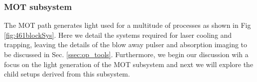 %	
%		
		
\subsubsection{MOT subsystem} \label{sec:motsubsystem}
The MOT path generates light used for a multitude of processes as shown in Fig \ref{fig:461blockSys}.
Here we detail the systems required for laser cooling and trapping, leaving the details of the blow away pulser and absorption imaging to be discussed in Sec. \ref{ssec:op_tools}.
Furthermore, we begin our discussion wih a focus on the light generation of the MOT subsystem and next we will explore the child setups derived from this subsystem.

